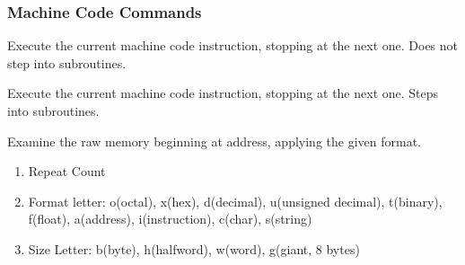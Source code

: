 \documentclass{beamer}
\begin{document}
\begin{frame}
    \frametitle{Machine Code Commands}
    \begin{description}[<+->]
        \item[nexti] Execute the current machine code
        instruction, stopping at the next one.  Does not step into subroutines.
        \item[stepi] Execute the current machine code instruction, stopping at the next one.  Steps into subroutines.
        \item[x/{\it fmt} {\it address}] Examine the raw memory beginning at address, applying the given format.  
            \begin{enumerate}
                \item Repeat Count
                \item Format letter: o(octal), x(hex), d(decimal), u(unsigned decimal), t(binary), f(float), a(address), i(instruction), c(char), s(string)
                \item Size Letter: b(byte), h(halfword), w(word), g(giant, 8 bytes)
            \end{enumerate}
    \end{description}
\end{frame}
\end{document}
